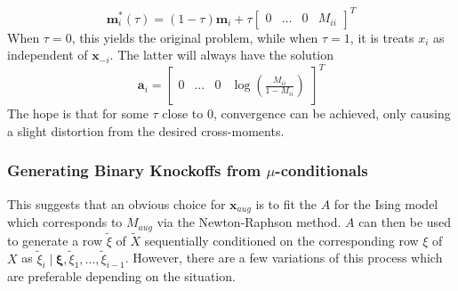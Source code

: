 \documentclass[11pt]{article}
\newcommand{\st}{ \; \big | \:}
\theoremstyle{definition}
\begin{document}
    \[\mathbf m_i^*(\tau) = (1-\tau)\mathbf m_i + \tau \left[ \begin{array}{cccc} 0 & \ldots & 0 & M_{ii} \end{array} \right]^T \]
            When $\tau=0$, this yields the original problem, while when $\tau=1$, it is treats $x_i$ as independent of $\mathbf x_{-i}$. The latter will always have the solution
            \[\mathbf a_i = \left[ \begin{array}{cccc} 0 & \ldots & 0 & \log\left(\frac{M_{ii}}{1-M_{ii}}\right) \end{array} \right]^T \]
            The hope is that for some $\tau$ close to $0$, convergence can be achieved, only causing a slight distortion from the desired cross-moments.

\subsubsection{Generating Binary Knockoffs from $\mu$-conditionals}
This suggests that an obvious choice for $\mathbf{x}_{aug}$ is to fit the $A$ for the Ising model which corresponds to $M_{aug}$ via the Newton-Raphson method. $A$ can then be used to generate a row $\tilde \xi$ of $\tilde X$ sequentially conditioned on the corresponding row $\xi$ of $X$ as $\tilde \xi_i \st \mathbf \xi,\tilde \xi_1,\ldots,\tilde \xi_{i-1}$. However, there are a few variations of this process which are preferable depending on the situation. 
\end{document}
